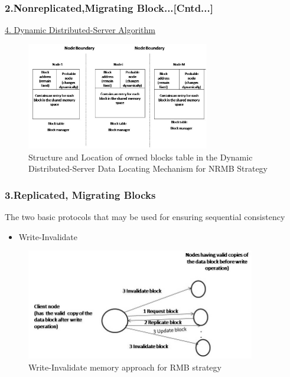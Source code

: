 \documentclass{beamer}
\begin{document}
\begin{frame}
	\frametitle{2.Nonreplicated,Migrating Block...[Cntd...]}
	\underline{4. Dynamic Distributed-Server Algorithm}
	\vspace{0.25cm}
	\begin{figure}
		\centering
		\includegraphics[width=8cm]{fig58.jpg}
		\caption{Structure and Location of owned blocks table in the Dynamic Distributed-Server Data Locating Mechanism for NRMB Strategy}
		\label{fig58}
	\end{figure}
\end{frame}


\begin{frame}
	\frametitle{3.Replicated, Migrating Blocks}
	The two basic protocols that may be used for ensuring sequential consistency
	\vspace{0.25cm}
	\begin{itemize}
		\item Write-Invalidate
	\end{itemize}
	\begin{figure}
		\centering
		\includegraphics[width=10cm]{fig59.jpg}
		\caption{Write-Invalidate memory approach for RMB strategy}
		\label{fig59}
	\end{figure}
\end{frame}
\end{document}

